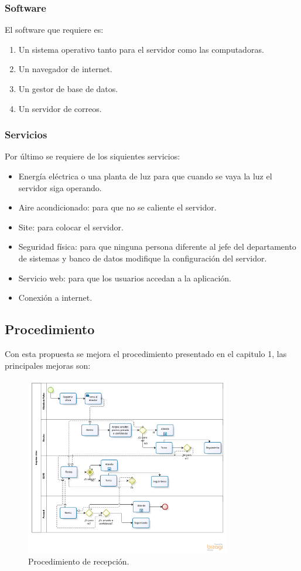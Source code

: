 \subsubsection{Software}
El software que requiere es: 
\begin{enumerate}
	\item Un sistema operativo tanto para el servidor como las computadoras.
	\item Un navegador de internet.
	\item Un gestor de base de datos.
	\item Un servidor de correos.
\end{enumerate}
\subsubsection{Servicios}

Por último se requiere de los siquientes servicios: 
\begin{itemize}
	\item Energía eléctrica o una planta de luz para que cuando se vaya la luz el servidor siga operando.
	\item Aire acondicionado: para que no se caliente el servidor.
	\item Site: para colocar el servidor.
	\item Seguridad física: para que ninguna persona diferente al jefe del departamento de sistemas y banco de datos modifique la configuración del servidor.
	\item Servicio web: para que los usuarios accedan a la aplicación. 
	\item Conexión a internet.
\end{itemize} 

\subsection{Procedimiento}
Con esta propuesta se mejora el procedimiento presentado en el capitulo 1, las principales mejoras son:

\begin{figure}[htbp!]
		\centering
			\includegraphics[width=0.8\textwidth]{images/propuesta/registrooficio}
		\caption{Procedimiento de recepción.}
		\label{Registro oficio}
	\end{figure}
	
